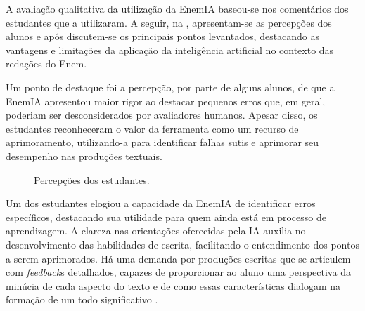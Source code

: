 \documentclass[portuguese]{textolivre}
\begin{document}
A avaliação qualitativa da utilização da EnemIA baseou-se nos comentários dos estudantes que a utilizaram. A seguir, na , apresentam-se as percepções dos alunos e após discutem-se os principais pontos levantados, destacando as vantagens e limitações da aplicação da inteligência artificial no contexto das redações do Enem.

Um ponto de destaque foi a percepção, por parte de alguns alunos, de que a EnemIA apresentou maior rigor ao destacar pequenos erros que, em geral, poderiam ser desconsiderados por avaliadores humanos. Apesar disso, os estudantes reconheceram o valor da ferramenta como um recurso de aprimoramento, utilizando-a para identificar falhas sutis e aprimorar seu desempenho nas produções textuais. 

\begin{figure}[!htbp]
\centering
\begin{minipage}{\textwidth}
 \caption{Percepções dos estudantes.}
 \label{fig05}
\end{minipage}
\end{figure}

Um dos estudantes elogiou a capacidade da EnemIA de identificar erros específicos, destacando sua utilidade para quem ainda está em processo de aprendizagem. A clareza nas orientações oferecidas pela IA auxilia no desenvolvimento das habilidades de escrita, facilitando o entendimento dos pontos a serem aprimorados. Há uma demanda por produções escritas que se articulem com \textit{feedback}s detalhados, capazes de proporcionar ao aluno uma perspectiva da minúcia de cada aspecto do texto e de como essas características dialogam na formação de um todo significativo \cite{geraldi2011linguagem}.
\end{document}
